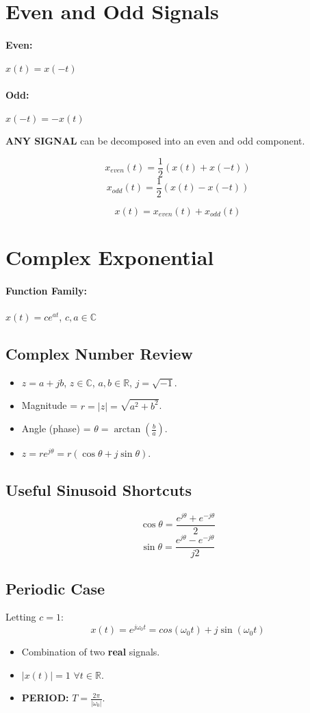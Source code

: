 \documentclass[a4paper,12pt]{report}
\def\reals{\mathbb{R}}
\begin{document}
\section{Even and Odd Signals}

\paragraph{Even: } $x(t) = x(-t)$
\paragraph{Odd: } $x(-t) = -x(t)$

\textbf{ANY SIGNAL} can be decomposed into an even and odd component.

$$x_{even}(t) = \frac{1}{2} (x(t) + x(-t))$$
$$x_{odd}(t) = \frac{1}{2} (x(t) - x(-t))$$

$$x(t) = x_{even}(t) + x_{odd}(t)$$


\section{Complex Exponential}
\paragraph{Function Family: } $x(t) = c e^{at}$, $c, a\in \mathbb{C}$

\subsection{Complex Number Review}
\begin{itemize}
\item $z = a+jb$, $z\in\mathbb{C}$, $a, b \in \mathbb{R}$, $j = \sqrt{-1}$.
\item Magnitude = $r=|z| = \sqrt{a^2 + b^2}$.
\item Angle (phase) = $\theta = \arctan(\frac{b}{a})$.
\item $z = re^{j\theta} = r(\cos\theta + j\sin\theta)$.
\end{itemize}

\subsection{Useful Sinusoid Shortcuts}
$$\cos\theta = \frac{e^{j\theta} + e^{-j\theta}}{2}$$
$$\sin\theta = \frac{e^{j\theta} - e^{-j\theta}}{j2}$$

\subsection{Periodic Case}
Letting $c = 1$:
$$x(t) = e^{j\omega_0 t} = cos(\omega_0 t) + j\sin(\omega_0 t)$$
\begin{itemize}
\item Combination of two \textbf{real} signals.
\item $|x(t)| = 1$ $\forall t\in\reals$.
\item \textbf{PERIOD: } $T=\frac{2\pi}{|\omega_0|}$.
\end{itemize}
\end{document}
